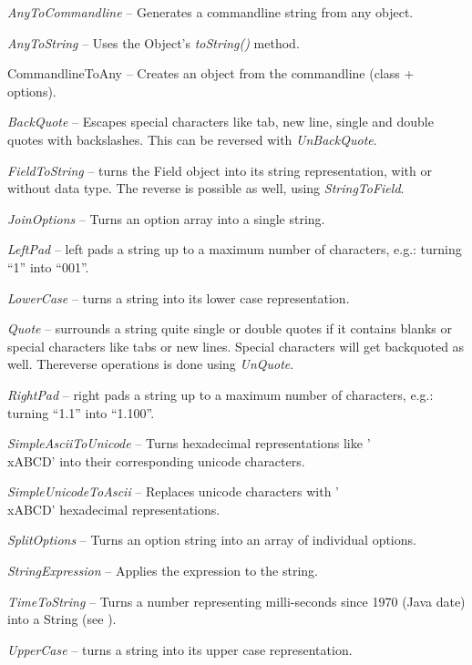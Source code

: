 \begin{tight_itemize}
	\item \textit{AnyToCommandline} -- Generates a commandline string from any
	object.
	\item \textit{AnyToString} -- Uses the Object's \textit{toString()} method.
	\item CommandlineToAny -- Creates an object from the commandline (class +
	options).
	\item \textit{BackQuote} -- Escapes special characters like tab, new line, 
	single and double quotes with backslashes. This can be reversed with 
	\textit{UnBackQuote}.
	\item \textit{FieldToString} -- turns the Field object into its string
	representation, with or without data type. The reverse is possible as well,
	using \textit{StringToField}.
	\item \textit{JoinOptions} -- Turns an option array into a single string.
	\item \textit{LeftPad} -- left pads a string up to a maximum number of
	characters, e.g.: turning ``1'' into ``001''.
	\item \textit{LowerCase} -- turns a string into its lower case representation.
	\item \textit{Quote} -- surrounds a string quite single or double quotes
	if it contains blanks or special characters like tabs or new lines. Special
	characters will get backquoted as well. Thereverse operations is done 
	using \textit{UnQuote}.
	\item \textit{RightPad} -- right pads a string up to a maximum number of
	characters, e.g.: turning ``1.1'' into ``1.100''.
	\item \textit{SimpleAsciiToUnicode} -- Turns hexadecimal representations
	like '\\xABCD' into their corresponding unicode characters.
	\item \textit{SimpleUnicodeToAscii} -- Replaces unicode characters with
	'\\xABCD' hexadecimal representations.
	\item \textit{SplitOptions} -- Turns an option string into an array of individual options.
	\item \textit{StringExpression} -- Applies the expression to the string.
	\item \textit{TimeToString} -- Turns a number representing milli-seconds since
	1970 (Java date) into a String (see \cite{dateformat}).
	\item \textit{UpperCase} -- turns a string into its upper case representation.
\end{tight_itemize}
